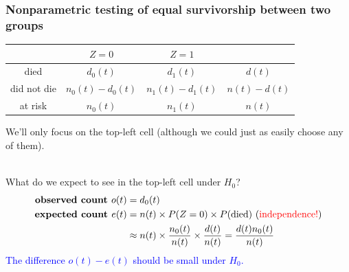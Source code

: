 \documentclass[10pt,t]{beamer}
\begin{document}
\begin{frame}
\frametitle{Nonparametric testing of equal survivorship between two groups}

\begin{center}
\begin{tabular}{c|c|c|c}
& $Z = 0$ & $Z = 1$ \\
\hline
died & $d_0(t)$ & $d_1(t)$ & $d(t)$ \\
did not die & $n_0(t) - d_0(t)$ & $n_1(t) - d_1(t)$ & $n(t) - d(t)$\\
at risk & $n_0(t)$ & $n_1(t)$ & $n(t)$
\end{tabular}
\end{center}\vspace{-0.2cm}

We'll only focus on the top-left cell (although we could just as easily choose any of them).
\\ ~\ 

What do we expect to see in the top-left cell under $H_0$?
\begin{align*}
\textbf{observed count } o(t) &= d_0(t) \\
\textbf{expected count } e(t) &= n(t) \times P(Z = 0) \times P(\text{died}) \text{  (\textcolor{red}{independence!})}\\
&\approx n(t)\times \frac{n_0(t)}{n(t)}\times  \frac{d(t)}{n(t)} = \frac{d(t)n_0(t)}{n(t)}
\end{align*}
\textcolor{blue}{The difference $o(t) - e(t)$ should be small under $H_0$.} 
\end{frame}
\end{document}
